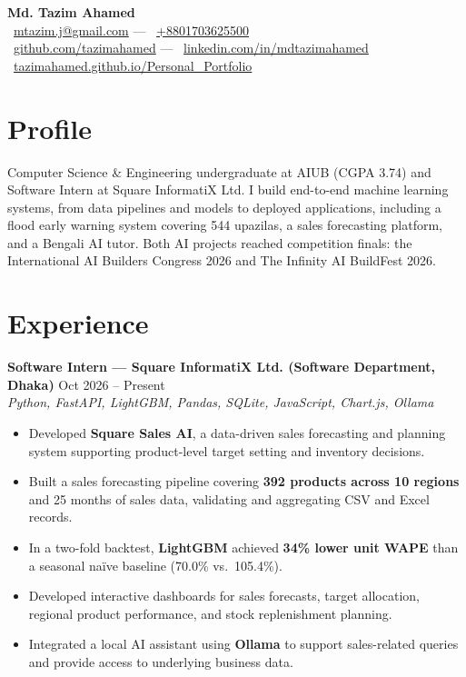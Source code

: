 \documentclass[10pt,a4paper]{article}
\newcommand{\iconEnvelope}{\faEnvelope}
\newcommand{\iconPhone}{\faPhone}
\newcommand{\iconGithub}{\faGithub}
\newcommand{\iconLinkedin}{\faLinkedin}
\newcommand{\iconGlobe}{\faGlobe}
\newcommand{\resumeEntry}[3]{%
  \noindent\textbf{#1} \hfill #2\\
  {\textit{#3}}
}
\newenvironment{keep}
  {\par\noindent\begin{minipage}{\linewidth}\setlength{\parskip}{0pt}}
  {\end{minipage}\par\vspace{5pt}}
\begin{document}
\begin{center}
    {\huge \textbf{Md. Tazim Ahamed}}\\[6pt]
    {\color{linkblue}\iconEnvelope}\ \href{mailto:mtazim.j@gmail.com}{mtazim.j@gmail.com} \quad --- \quad
    {\color{linkblue}\iconPhone}\ \href{tel:+8801703625500}{+8801703625500}\\[4pt]
    {\color{linkblue}\iconGithub}\ \href{https://github.com/tazimahamed}{github.com/tazimahamed} \quad --- \quad
    {\color{linkblue}\iconLinkedin}\ \href{https://www.linkedin.com/in/mdtazimahamed}{linkedin.com/in/mdtazimahamed}\\[4pt]
    {\color{linkblue}\iconGlobe}\ \href{https://tazimahamed.github.io/Personal_Portfolio/}{tazimahamed.github.io/Personal\_Portfolio}
\end{center}

\section*{Profile}
Computer Science \& Engineering undergraduate at AIUB (CGPA 3.74) and Software Intern at Square InformatiX Ltd.
I build end-to-end machine learning systems, from data pipelines and models to deployed applications, including
a flood early warning system covering 544 upazilas, a sales forecasting platform, and a Bengali AI tutor. Both
AI projects reached competition finals: the International AI Builders Congress 2026 and The Infinity AI BuildFest 2026.

\section*{Experience}
\begin{keep}
\resumeEntry{Software Intern --- Square InformatiX Ltd. (Software Department, Dhaka)}{Oct 2026 -- Present}{Python, FastAPI, LightGBM, Pandas, SQLite, JavaScript, Chart.js, Ollama}
\begin{itemize}
    \item Developed \textbf{Square Sales AI}, a data-driven sales forecasting and planning system supporting product-level target setting and inventory decisions.
    \item Built a sales forecasting pipeline covering \textbf{392 products across 10 regions} and 25 months of sales data, validating and aggregating CSV and Excel records.
    \item In a two-fold backtest, \textbf{LightGBM} achieved \textbf{34\% lower unit WAPE} than a seasonal naïve baseline (70.0\% vs.\ 105.4\%).
    \item Developed interactive dashboards for sales forecasts, target allocation, regional product performance, and stock replenishment planning.
    \item Integrated a local AI assistant using \textbf{Ollama} to support sales-related queries and provide access to underlying business data.
\end{itemize}
\end{keep}
\end{document}
